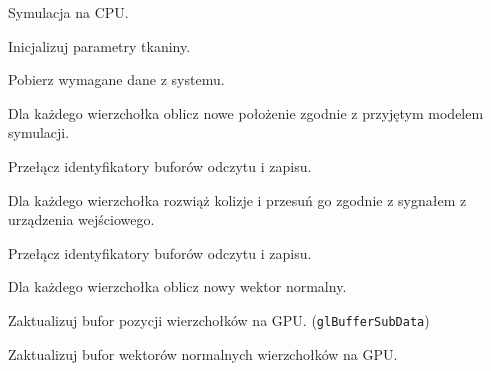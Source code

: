 		\newpage
		\begin{algorithm}[H]
			\label{alg_5_2}
			\caption{Symulacja na CPU.}	
			
			Inicjalizuj parametry tkaniny.
			
			{
				Pobierz wymagane dane z systemu.
				
				Dla każdego wierzchołka oblicz nowe położenie zgodnie z przyjętym modelem symulacji.
				
				Przełącz identyfikatory buforów odczytu i zapisu.
				
				Dla każdego wierzchołka rozwiąż kolizje i przesuń go zgodnie z sygnałem z urządzenia wejściowego.
				
				Przełącz identyfikatory buforów odczytu i zapisu.
				
				Dla każdego wierzchołka oblicz nowy wektor normalny.
				
				Zaktualizuj bufor pozycji wierzchołków na GPU. (\texttt{glBufferSubData})
				
				Zaktualizuj bufor wektorów normalnych wierzchołków na GPU.
			}
			
		\end{algorithm}
		\newpage
